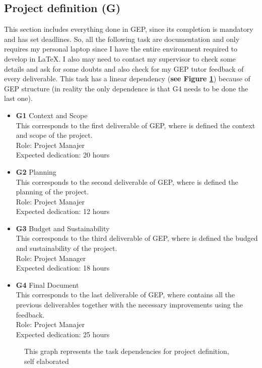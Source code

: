 \subsection{Project definition \textbf{(G)} }
This section includes everything done in GEP, since its completion is mandatory and has set deadlines.
So, all the following task are documentation and only requires my personal laptop since I have the entire environment required to develop in \LaTeX.
I also may need to contact my supervisor to check some details and ask for some doubts and also check for my GEP tutor feedback of every deliverable.
This task has a linear dependency (\textbf{see Figure \ref{G_dependences}}) because of GEP structure (in reality the only dependence is that G4 needs to be done the last one).
\begin{itemize}
    \item \textbf{G1} Context and Scope \\
        This corresponds to the first deliverable of GEP, where is defined the context and scope of the project. \\
        Role: Project Manajer \\
        Expected dedication: 20 hours
    \item \textbf{G2} Planning \\
        This corresponds to the second deliverable of GEP, where is defined the planning of the project. \\
        Role: Project Manajer \\
        Expected dedication: 12 hours
    \item \textbf{G3} Budget and Sustainability \\
        This corresponds to the third deliverable of GEP, where is defined the budged and sustainability of the project. \\
        Role: Project Manager \\
        Expected dedication: 18 hours 
    \item \textbf{G4} Final Document \\
        This corresponds to the last deliverable of GEP, where contains all the previous deliverables together with the necessary improvements using the feedback. \\
        Role: Project Manajer \\
        Expected dedication: 25 hours
\end{itemize}
\begin{figure}[h]
    \centering
    \caption[{[Pla] TD for project definition}]{This graph represents the task dependencies for project definition, self elaborated}
    \label{G_dependences}
\end{figure}

